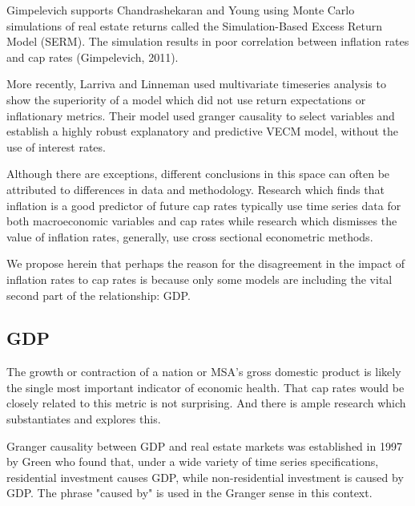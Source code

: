 Gimpelevich \citep*{Gimpelevich2011} supports Chandrashekaran and Young using Monte Carlo simulations of real estate returns called the Simulation-Based Excess Return Model (SERM). The simulation results in poor correlation between inflation rates and cap rates (Gimpelevich, 2011).

More recently, Larriva and Linneman \citep*{larriva2021determinants} used multivariate timeseries analysis to show the superiority of a model which did not use return expectations or inflationary metrics. Their model used granger causality to select variables and establish a highly robust explanatory and predictive VECM model, without the use of interest rates.

Although there are exceptions, different conclusions in this space can often be attributed to differences in data and methodology. Research which finds that inflation is a good predictor of future cap rates typically use time series data for both macroeconomic variables and cap rates while research which dismisses the value of inflation rates, generally, use cross sectional econometric methods.

We propose herein that perhaps the reason for the disagreement in the impact of inflation rates to cap rates is because only some models are including the vital second part of the relationship: GDP.


\subsection{GDP}

The growth or contraction of a nation or MSA's gross domestic product is likely the single most important indicator of economic health. That cap rates would be closely related to this metric is not surprising. And there is ample research which substantiates and explores this.

Granger causality between GDP and real estate markets was established in 1997 by Green \citep{green1997follow} who found that, under a wide variety of time series specifications, residential investment causes GDP, while non-residential investment is caused by GDP. The phrase "caused by" is used in the Granger sense in this context. 


